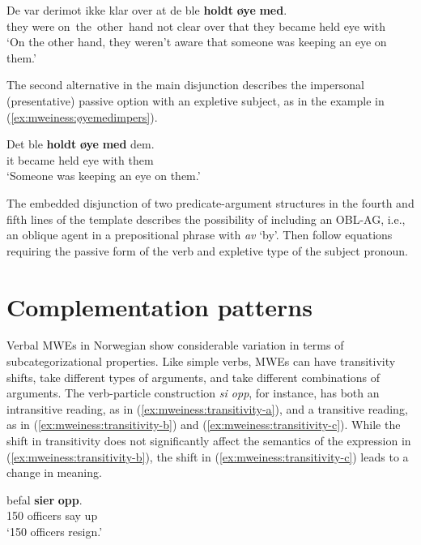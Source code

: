 \documentclass[output=paper]{langsci/langscibook}
\begin{document}
\ea\label{ex:mweiness:øyemedpass}
\gll De var derimot ikke klar over at de ble \textbf{holdt} \textbf{øye} \textbf{med}. \\
     they were on the other hand not clear over that they became held eye with\\
\glt `On the other hand, they weren't aware that someone was keeping an eye on them.'
\z

The second alternative in the main disjunction describes the impersonal (presentative) passive option with an expletive subject, as in the example in (\ref{ex:mweiness:øyemedimpers}).

\ea\label{ex:mweiness:øyemedimpers}
\gll Det ble \textbf{holdt} \textbf{øye} \textbf{med} dem. \\
     it became held eye with them\\
\glt `Someone was keeping an eye on them.'
\z

The embedded disjunction of two predicate-argument structures in the fourth and fifth lines of the template describes the possibility of including an OBL-AG, i.e., an oblique agent in a prepositional phrase with \textit{av} `by'.
Then follow equations requiring the passive form of the verb and expletive type of the subject pronoun.

\section{Complementation patterns}\label{sec:mweiness:complementation}

Verbal MWEs in Norwegian show considerable variation in terms of subcategorizational properties. 
Like simple verbs, MWEs can have transitivity shifts, take different types of arguments, and take different combinations of arguments. 
The verb-particle construction \emph{si opp}, for instance, has both an intransitive reading, as in (\ref{ex:mweiness:transitivity-a}), and a transitive reading, as in (\ref{ex:mweiness:transitivity-b}) and (\ref{ex:mweiness:transitivity-c}).
While the shift in transitivity does not significantly affect the semantics of the expression in (\ref{ex:mweiness:transitivity-b}), the shift in (\ref{ex:mweiness:transitivity-c}) leads to a change in meaning.  

\ea \label{ex:mweiness:transitivity-a}  befal \textbf{sier} \textbf{opp}. \\ 
     150 officers say up\\
\glt `150 officers resign.' \\ 
\z
\end{document}
